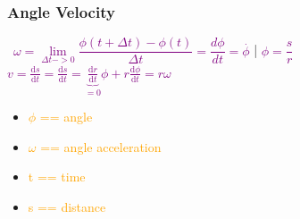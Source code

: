 \documentclass[main.tex,fontsize=8pt,paper=a4,paper=portrait,DIV=calc,]{scrartcl}
\begin{document}
\begin{multicols*}{2}
\subsubsection{Angle Velocity}
\, \newline
\large \textcolor{purple}{\( \omega = \underset{\Delta t -> 0}{\lim} \dfrac{\phi(t + \Delta t) - \phi(t)}{\Delta t} = \dfrac{d\phi}{dt} = \overset{.}{\phi} \)} | 
\large \textcolor{purple}{\( \phi = \dfrac{s}{r} \)}\newline
\large \textcolor{purple}{\( v = \frac{\mathrm{d}s}{\mathrm{d}t} = \frac{\mathrm{d}s}{\mathrm{d}t} = \underbrace{\frac{\mathrm{d}r}{\mathrm{d}t}}_{=0} \phi + r\frac{\mathrm{d}\phi}{\mathrm{d}t} = r\omega\quad\)}
\, \newline \normalsize
\begin{itemize}
\item \textcolor{orange}{\(\phi\) == angle}
\item \textcolor{orange}{\(\omega\) == angle acceleration}
\item \textcolor{orange}{ t == time}
\item \textcolor{orange}{s == distance}

\end{itemize}


\end{multicols*}
\end{document}
